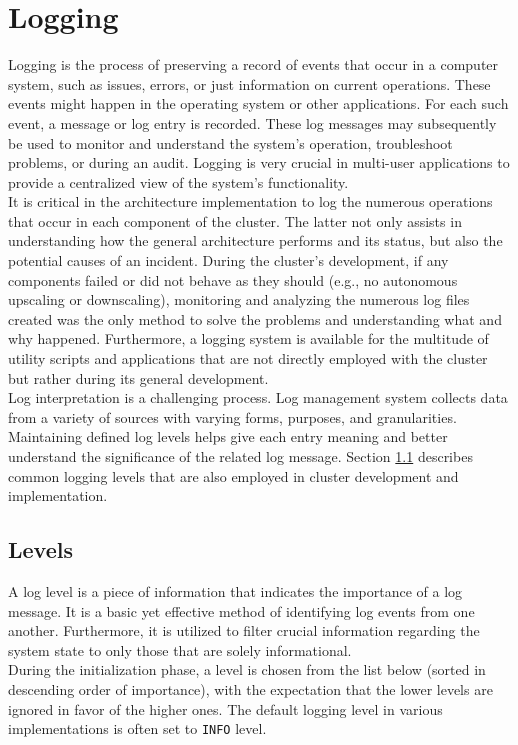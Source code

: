 \chapter{Logging}
\label{cha:logging}

Logging is the process of preserving a record of events that occur in a computer
system, such as issues, errors, or just information on current operations. These
events might happen in the operating system or other applications. For each such
event, a message or log entry is recorded. These log messages may subsequently
be used to monitor and understand the system's operation, troubleshoot problems,
or during an audit. Logging is very crucial in multi-user applications to provide
a centralized view of the system's functionality\cite{logging}. \\ %
It is critical in the architecture implementation to log the numerous operations
that occur in each component of the cluster. The latter not only assists in understanding
how the general architecture performs and its status, but also the potential
causes of an incident. During the cluster's development, if any components
failed or did not behave as they should (e.g., no autonomous upscaling or downscaling),
monitoring and analyzing the numerous log files created was the only method to solve
the problems and understanding what and why happened. Furthermore, a logging system
is available for the multitude of utility scripts and applications that are not directly
employed with the cluster but rather during its general development. \\ %
Log interpretation is a challenging process. Log management system collects data
from a variety of sources with varying forms, purposes, and granularities. Maintaining
defined log levels helps give each entry meaning and better understand the significance
of the related log message\cite{logging_levels}. Section \ref{sec:logging_levels}
describes common logging levels that are also employed in cluster development and
implementation.

\section{Levels}
\label{sec:logging_levels}

A log level is a piece of information that indicates the importance of a log
message. It is a basic yet effective method of identifying log events from one another.
Furthermore, it is utilized to filter crucial information regarding the system state
to only those that are solely informational\cite{logging_levels}. \\ %
During the initialization phase, a level is chosen from the list below (sorted
in descending order of importance), with the expectation that the lower levels
are ignored in favor of the higher ones. The default logging level in various implementations
is often set to \texttt{INFO} level.

